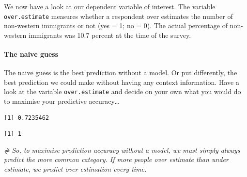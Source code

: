\documentclass[]{article}
\newenvironment{Shaded}{\begin{snugshade}}{\end{snugshade}}
\newcommand{\CommentTok}[1]{\textcolor[rgb]{0.56,0.35,0.01}{\textit{#1}}}
\newcommand{\DataTypeTok}[1]{\textcolor[rgb]{0.13,0.29,0.53}{#1}}
\newcommand{\DecValTok}[1]{\textcolor[rgb]{0.00,0.00,0.81}{#1}}
\newcommand{\FloatTok}[1]{\textcolor[rgb]{0.00,0.00,0.81}{#1}}
\newcommand{\KeywordTok}[1]{\textcolor[rgb]{0.13,0.29,0.53}{\textbf{#1}}}
\newcommand{\NormalTok}[1]{#1}
\newcommand{\OperatorTok}[1]{\textcolor[rgb]{0.81,0.36,0.00}{\textbf{#1}}}
\newcommand{\StringTok}[1]{\textcolor[rgb]{0.31,0.60,0.02}{#1}}
\let\oldparagraph\paragraph
\renewcommand{\paragraph}[1]{\oldparagraph{#1}\mbox{}}
\begin{document}
We now have a look at our dependent variable of interest. The variable \texttt{over.estimate} measures whether a respondent over estimates the number of non-western immigrants or not (yes = 1; no = 0). The actual percentage of non-western immigrants was 10.7 percent at the time of the survey.

\hypertarget{the-naive-guess}{%
\paragraph{The naive guess}\label{the-naive-guess}}

The naive guess is the best prediction without a model. Or put differently, the best prediction we could make without having any context information. Have a look at the variable \texttt{over.estimate} and decide on your own what you would do to maximise your predictive accuracy\ldots{}

\begin{Shaded}
\end{Shaded}

\begin{verbatim}
[1] 0.7235462
\end{verbatim}

\begin{Shaded}
\end{Shaded}

\begin{verbatim}
[1] 1
\end{verbatim}

\begin{Shaded}
\begin{Highlighting}[]
\CommentTok{# So, to maximise prediction accuracy without a model, we must simply always predict the more common category. If more people over estimate than under estimate, we predict over estimation every time.}
\end{Highlighting}
\end{Shaded}
\end{document}
